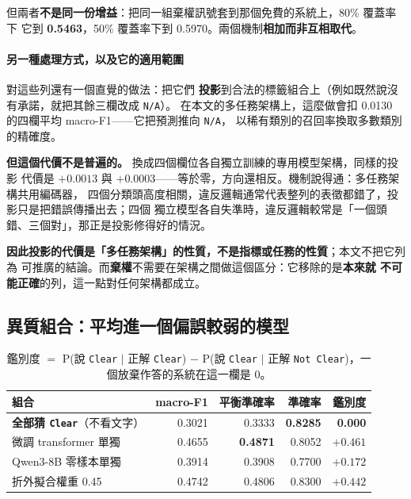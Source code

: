 \documentclass[11pt,a4paper]{ctexart}
\newcommand{\fn}[1]{\texttt{#1}}
\begin{document}
\medskip
但兩者\textbf{不是同一份增益}：把同一組棄權訊號套到那個免費的系統上，80\% 覆蓋率下
它到 \textbf{0.5463}，50\% 覆蓋率下到 0.5970。兩個機制\textbf{相加而非互相取代}。

\paragraph{另一種處理方式，以及它的適用範圍} 對這些列還有一個直覺的做法：把它們
\textbf{投影}到合法的標籤組合上（例如既然說沒有承諾，就把其餘三欄改成 \fn{N/A}）。
在本文的多任務架構上，這麼做會扣 0.0130 的四欄平均 macro-F1——它把預測推向 \fn{N/A}，
以稀有類別的召回率換取多數類別的精確度。

\medskip
\textbf{但這個代價不是普遍的。} 換成四個欄位各自獨立訓練的專用模型架構，同樣的投影
代價是 $+0.0013$ 與 $+0.0003$——等於零，方向還相反。機制說得通：多任務架構共用編碼器，
四個分類頭高度相關，違反邏輯通常代表整列的表徵都錯了，投影只是把錯誤傳播出去；四個
獨立模型各自失準時，違反邏輯較常是「一個頭錯、三個對」，那正是投影修得好的情況。

\begin{tcolorbox}[colback=gray!8, colframe=gray!55]
\textbf{因此投影的代價是「多任務架構」的性質，不是指標或任務的性質}；本文不把它列為
可推廣的結論。而\textbf{棄權}不需要在架構之間做這個區分：它移除的是\textbf{本來就
不可能正確}的列，這一點對任何架構都成立。
\end{tcolorbox}

\subsection{異質組合：平均進一個偏誤較弱的模型}

\begin{table}[h]
\centering\small
\begin{tabular}{@{}lrrrr@{}}
\toprule
組合 & macro-F1 & 平衡準確率 & 準確率 & 鑑別度 \\
\midrule
\rowcolor{gray!12}
\textbf{全部猜 \fn{Clear}}（不看文字） & 0.3021 & 0.3333 & \textbf{0.8285} & \textbf{0.000} \\
微調 transformer 單獨 & 0.4655 & \textbf{0.4871} & 0.8052 & \textbf{$+0.461$} \\
Qwen3-8B 零樣本單獨 & 0.3914 & 0.3908 & 0.7700 & $+0.172$ \\
折外擬合權重 0.45 & 0.4742 & 0.4806 & 0.8300 & $+0.442$ \\
\bottomrule
\end{tabular}
\caption{鑑別度 $=$ P(說 \fn{Clear} $\mid$ 正解 \fn{Clear}) $-$ P(說 \fn{Clear}
$\mid$ 正解 \fn{Not Clear})，一個放棄作答的系統在這一欄是 0。}
\end{table}
\end{document}
